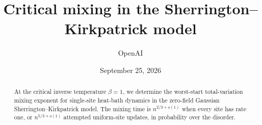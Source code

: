 \documentclass[11pt]{article}
\title{Critical mixing in the Sherrington--Kirkpatrick model}
\author{OpenAI}
\date{September 25, 2026}
\begin{document}
\maketitle
\begin{abstract}
At the critical inverse temperature $\beta=1$, we determine the worst-start
total-variation mixing exponent for single-site heat-bath dynamics in the
zero-field Gaussian Sherrington--Kirkpatrick model. The mixing time is
$n^{2/3+o(1)}$ when every site has rate one, or $n^{5/3+o(1)}$ attempted
uniform-site updates, in probability over the disorder.
\end{abstract}
\tableofcontents




















\end{document}
